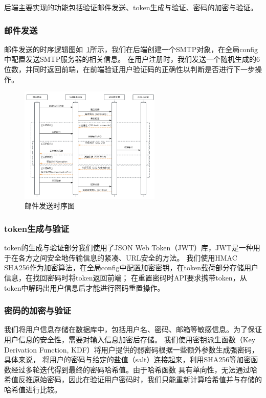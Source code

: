 后端主要实现的功能包括验证邮件发送、token生成与验证、密码的加密与验证。

\subsubsection{邮件发送}
邮件发送的时序逻辑图如~\ref{fig:SMTP-sequence}所示，我们在后端创建一个SMTP对象，在全局config中配置发送SMTP服务器的相关信息。
在用户注册时，我们发送一个随机生成的6位数，并同时返回前端，在前端验证用户验证码的正确性以判断是否进行下一步操作。

\begin{figure}[ht]
    \centering
    \includegraphics[width=0.6\textwidth]{source/img/SMTP_sequence.png}
    \caption{邮件发送时序图}
    \label{fig:SMTP-sequence}
\end{figure}

\subsubsection{token生成与验证}
token的生成与验证部分我们使用了JSON Web Token（JWT）库，JWT是一种用于在各方之间安全地传输信息的紧凑、URL安全的方法。
我们使用HMAC SHA256作为加密算法，在全局config中配置加密密钥，在token载荷部分存储用户信息，在找回密码时将token返回前端；
在重置密码时API要求携带token，从token中解码出用户信息后才能进行密码重置操作。

\subsubsection{密码的加密与验证}

我们将用户信息存储在数据库中，包括用户名、密码、邮箱等敏感信息。为了保证用户信息的安全性，需要对输入信息加密后存储。
我们使用密钥派生函数（Key Derivation Function, KDF）将用户提供的弱密码根据一些额外参数生成强密码，具体来说，
将用户的密码与给定的盐值（salt）连接起来，利用SHA256等加密函数经过多轮迭代得到最终的密码哈希值。由于哈希函数
具有单向性，无法通过哈希值反推原始密码，因此在验证用户密码时，我们只能重新计算哈希值并与存储的哈希值进行比较。

